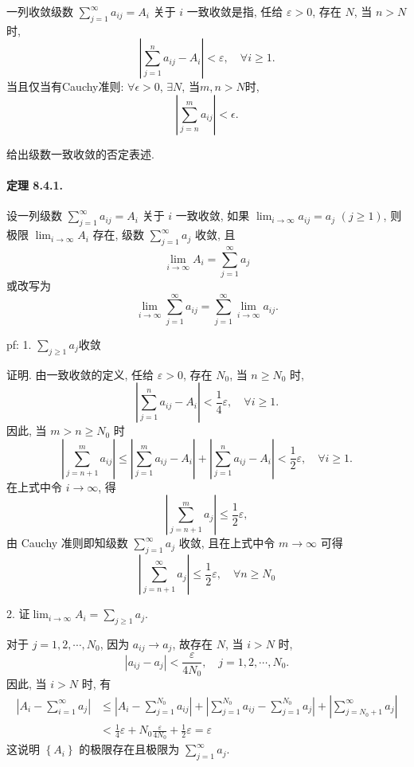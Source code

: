 一列收敛级数 $\sum_{j=1}^{\infty}a_{ij}=A_{i}$ 关于 $i$ 一致收敛是指, 任给 $\varepsilon>0$,
存在 $N$, 当 $n>N$ 时, 
\[
\left|\sum_{j=1}^{n}a_{ij}-A_{i}\right|<\varepsilon,\quad\forall i\geqslant1.
\]
当且仅当有Cauchy准则: $\forall\epsilon>0$, $\exists N$, 当$m,n>N$时, 
\[
\left|\sum_{j=n}^{m}a_{ij}\right|<\epsilon.
\]

给出级数一致收敛的否定表述.

\paragraph{定理 8.4.1. }

设一列级数 $\sum_{j=1}^{\infty}a_{ij}=A_{i}$ 关于 $i$ 一致收敛, 如果 $\lim_{i\rightarrow\infty}a_{ij}=a_{j}$
$(j\geqslant1)$, 则极限 $\lim_{i\rightarrow\infty}A_{i}$ 存在, 级数 $\sum_{j=1}^{\infty}a_{j}$
收敛, 且 
\[
\lim_{i\rightarrow\infty}A_{i}=\sum_{j=1}^{\infty}a_{j}
\]
或改写为 
\[
\lim_{i\rightarrow\infty}\sum_{j=1}^{\infty}a_{ij}=\sum_{j=1}^{\infty}\lim_{i\rightarrow\infty}a_{ij}.
\]

pf: 1. $\sum_{j\ge1}a_{j}$收敛

证明. 由一致收敛的定义, 任给 $\varepsilon>0$, 存在 $N_{0}$, 当 $n\geqslant N_{0}$
时, 
\[
\left|\sum_{j=1}^{n}a_{ij}-A_{i}\right|<\frac{1}{4}\varepsilon,\quad\forall i\geqslant1.
\]
因此, 当 $m>n\geqslant N_{0}$ 时 
\[
\left|\sum_{j=n+1}^{m}a_{ij}\right|\leqslant\left|\sum_{j=1}^{m}a_{ij}-A_{i}\right|+\left|\sum_{j=1}^{n}a_{ij}-A_{i}\right|<\frac{1}{2}\varepsilon,\quad\forall i\geqslant1.
\]
在上式中令 $i\rightarrow\infty$, 得 
\[
\left|\sum_{j=n+1}^{m}a_{j}\right|\leqslant\frac{1}{2}\varepsilon,
\]
由 Cauchy 准则即知级数 $\sum_{j=1}^{\infty}a_{j}$ 收敛, 且在上式中令 $m\rightarrow\infty$
可得 
\[
\left|\sum_{j=n+1}^{\infty}a_{j}\right|\leqslant\frac{1}{2}\varepsilon,\quad\forall n\geqslant N_{0}
\]

2. 证$\lim_{i\to\infty}A_{i}=\sum_{j\ge1}a_{j}$.

对于 $j=1,2,\cdots,N_{0}$, 因为 $a_{ij}\rightarrow a_{j}$, 故存在 $N$,
当 $i>N$ 时, 
\[
\left|a_{ij}-a_{j}\right|<\frac{\varepsilon}{4N_{0}},\quad j=1,2,\cdots,N_{0}.
\]
因此, 当 $i>N$ 时, 有 
\[
\begin{aligned}\left|A_{i}-\sum_{i=1}^{\infty}a_{j}\right| & \leqslant\left|A_{i}-\sum_{j=1}^{N_{0}}a_{ij}\right|+\left|\sum_{j=1}^{N_{0}}a_{ij}-\sum_{j=1}^{N_{0}}a_{j}\right|+\left|\sum_{j=N_{0}+1}^{\infty}a_{j}\right|\\
 & <\frac{1}{4}\varepsilon+N_{0}\frac{\varepsilon}{4N_{0}}+\frac{1}{2}\varepsilon=\varepsilon
\end{aligned}
\]
这说明 $\left\{ A_{i}\right\} $ 的极限存在且极限为 $\sum_{j=1}^{\infty}a_{j}$.

